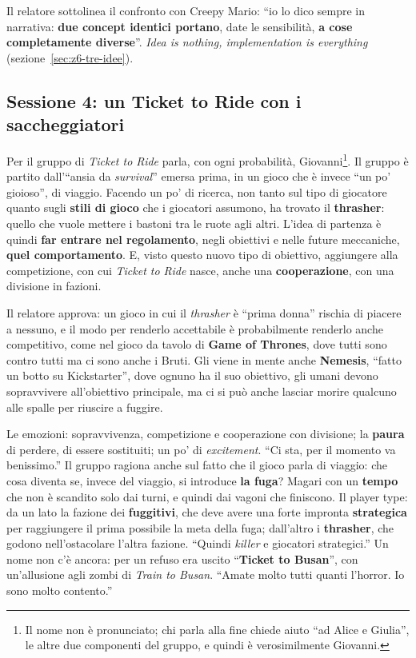 Il relatore sottolinea il confronto con Creepy Mario: ``io lo dico sempre in
narrativa: \textbf{due concept identici portano}, date le sensibilità, \textbf{a
cose completamente diverse}''. \emph{Idea is nothing, implementation is
everything} (sezione~\ref{sec:z6-tre-idee}).

\subsection{Sessione 4: un Ticket to Ride con i saccheggiatori}

Per il gruppo di \emph{Ticket to Ride} parla, con ogni probabilità, Giovanni\footnote{Il nome non è
pronunciato; chi parla alla fine chiede aiuto ``ad Alice e Giulia'', le altre due
componenti del gruppo, e quindi è verosimilmente Giovanni.}. Il
gruppo è partito dall'``ansia da \emph{survival}'' emersa prima, in un gioco che è
invece ``un po' gioioso'', di viaggio. Facendo un po' di ricerca, non tanto sul
tipo di giocatore quanto sugli \textbf{stili di gioco} che i giocatori assumono, ha
trovato il \textbf{thrasher}: quello che vuole mettere i bastoni tra le ruote agli
altri. L'idea di partenza è quindi \textbf{far entrare nel regolamento}, negli
obiettivi e nelle future meccaniche, \textbf{quel comportamento}. E, visto questo
nuovo tipo di obiettivo, aggiungere alla competizione, con cui \emph{Ticket to
Ride} nasce, anche una \textbf{cooperazione}, con una divisione in fazioni.

Il relatore approva: un gioco in cui il \emph{thrasher} è ``prima donna'' rischia di
piacere a nessuno, e il modo per renderlo accettabile è probabilmente renderlo anche
competitivo, come nel gioco da tavolo di \textbf{Game of Thrones}, dove tutti sono
contro tutti ma ci sono anche i Bruti. Gli viene in mente anche
\textbf{Nemesis}, ``fatto un botto su Kickstarter'', dove ognuno ha il suo
obiettivo, gli umani devono sopravvivere all'obiettivo principale, ma ci si può
anche lasciar morire qualcuno alle spalle per riuscire a fuggire.

Le emozioni: sopravvivenza, competizione e cooperazione con divisione; la
\textbf{paura} di perdere, di essere sostituiti; un po' di \emph{excitement}.
``Ci sta, per il momento va benissimo.'' Il gruppo ragiona anche sul fatto che il
gioco parla di viaggio: che cosa diventa se, invece del viaggio, si introduce
\textbf{la fuga}? Magari con un \textbf{tempo} che non è scandito solo dai turni,
e quindi dai vagoni che finiscono. Il player type: da un lato la fazione dei
\textbf{fuggitivi}, che deve avere una forte impronta \textbf{strategica} per
raggiungere il prima possibile la meta della fuga; dall'altro i
\textbf{thrasher}, che godono nell'ostacolare l'altra fazione. ``Quindi
\emph{killer} e giocatori strategici.'' Un nome non c'è ancora: per un refuso era
uscito ``\textbf{Ticket to Busan}'', con un'allusione agli zombi di \emph{Train to
Busan}. ``Amate molto tutti quanti l'horror. Io sono molto contento.''

